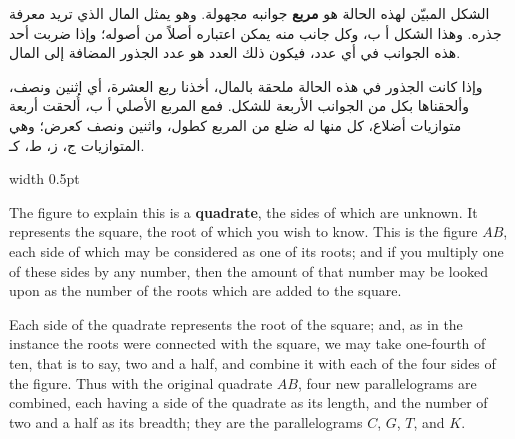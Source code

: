 \documentclass[10pt,a4paper]{book}
\newlength{\colwidth}
\newcommand{\bilingualpair}[2]{%
  \noindent
  \begin{minipage}[t]{\colwidth}
  \begin{flushright}
  \vspace{0pt}
  {\arabicfont\small #1}
  \end{flushright}
  \end{minipage}%
  \hfill\textcolor{columnsepclr}{\vrule width 0.5pt}\hfill
  \begin{minipage}[t]{\colwidth}
  \vspace{0pt}
  {\small #2}
  \end{minipage}%
  \par\vspace{0.6em}
}
\begin{document}
\bilingualpair{
الشكل المبيّن لهذه الحالة هو \textbf{مربع} جوانبه مجهولة. وهو
يمثل المال الذي تريد معرفة جذره. وهذا الشكل أ ب، وكل جانب
منه يمكن اعتباره أصلاً من أصوله؛ وإذا ضربت أحد هذه الجوانب
في أي عدد، فيكون ذلك العدد هو عدد الجذور المضافة إلى المال.

وإذا كانت الجذور في هذه الحالة ملحقة بالمال، أخذنا ربع العشرة،
أي اثنين ونصف، وألحقناها بكل من الجوانب الأربعة للشكل.
فمع المربع الأصلي أ ب، أُلحقت أربعة متوازيات أضلاع، كل منها
له ضلع من المربع كطول، واثنين ونصف كعرض؛ وهي المتوازيات
ج، ز، ط، كـ.
}{
The figure to explain this is a \textbf{quadrate}, the sides of which are
unknown. It represents the square, the root of which you wish to know. This
is the figure $AB$, each side of which may be considered as one of its roots;
and if you multiply one of these sides by any number, then the amount of that
number may be looked upon as the number of the roots which are added to the
square.

Each side of the quadrate represents the root of the square; and, as in the
instance the roots were connected with the square, we may take one-fourth of
ten, that is to say, two and a half, and combine it with each of the four
sides of the figure. Thus with the original quadrate $AB$, four new
parallelograms are combined, each having a side of the quadrate as its
length, and the number of two and a half as its breadth; they are the
parallelograms $C$, $G$, $T$, and $K$.
}
\end{document}
